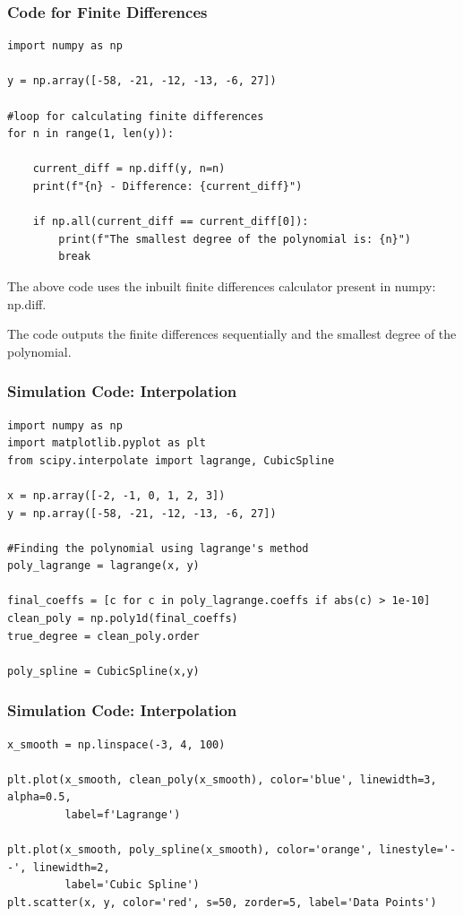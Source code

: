 \documentclass{beamer}
\begin{document}
\begin{frame}[fragile]
\frametitle{Code for Finite Differences}

\begin{lstlisting}
import numpy as np

y = np.array([-58, -21, -12, -13, -6, 27])

#loop for calculating finite differences
for n in range(1, len(y)):
    
    current_diff = np.diff(y, n=n)
    print(f"{n} - Difference: {current_diff}")
    
    if np.all(current_diff == current_diff[0]):
        print(f"The smallest degree of the polynomial is: {n}")
        break
\end{lstlisting}

The above code uses the inbuilt finite differences calculator present in numpy: np.diff. 

The code outputs the finite differences sequentially and the smallest degree of the polynomial. 
    
\end{frame}

\begin{frame}[fragile]
\frametitle{Simulation Code: Interpolation}
\begin{lstlisting}
import numpy as np
import matplotlib.pyplot as plt
from scipy.interpolate import lagrange, CubicSpline

x = np.array([-2, -1, 0, 1, 2, 3])
y = np.array([-58, -21, -12, -13, -6, 27])

#Finding the polynomial using lagrange's method
poly_lagrange = lagrange(x, y)

final_coeffs = [c for c in poly_lagrange.coeffs if abs(c) > 1e-10]
clean_poly = np.poly1d(final_coeffs)
true_degree = clean_poly.order

poly_spline = CubicSpline(x,y)
\end{lstlisting}
    
\end{frame}

\begin{frame}[fragile]
\frametitle{Simulation Code: Interpolation}
\begin{lstlisting}
x_smooth = np.linspace(-3, 4, 100) 

plt.plot(x_smooth, clean_poly(x_smooth), color='blue', linewidth=3, alpha=0.5, 
         label=f'Lagrange')

plt.plot(x_smooth, poly_spline(x_smooth), color='orange', linestyle='--', linewidth=2, 
         label='Cubic Spline')
plt.scatter(x, y, color='red', s=50, zorder=5, label='Data Points')

\end{lstlisting}
    
\end{frame}
\end{document}
